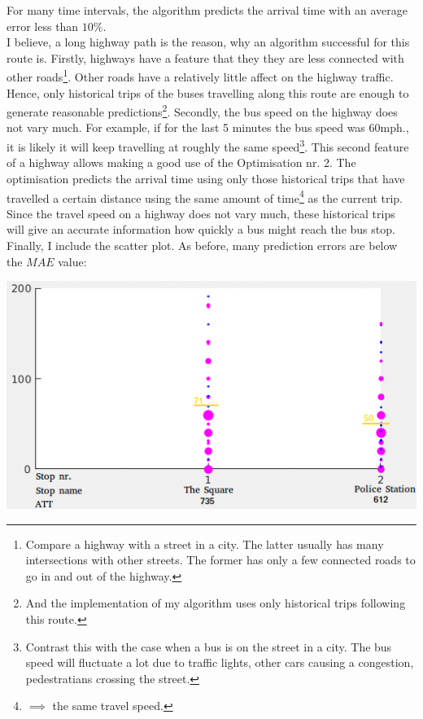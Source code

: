 \documentclass[12pt,a4paper,oneside,openright]{report}
\begin{document}
For many time intervals, the algorithm predicts the arrival time with an average error
less than $10\%$. \\

I believe, a long highway path is the reason, why an algorithm successful for this route is.
Firstly, highways have a feature that they they are less connected with other
roads\footnote{Compare a highway with a street in a city. The latter usually has many
intersections with other streets. The former has only a few connected roads to go in and out
of the highway.}. Other roads have a relatively little affect on the highway traffic.
Hence, only historical trips of the buses travelling along this route are enough to generate
reasonable predictions\footnote{And the implementation of my algorithm uses only historical trips
following this route.}. Secondly, the bus speed on the highway does not vary
much. For example, if for the last 5 minutes the bus speed was $60$mph., it is 
likely it will keep travelling at roughly the same speed\footnote{Contrast this with the
case when a bus is on the street in a city. The bus speed will fluctuate a lot due to
traffic lights, other cars causing a congestion, pedestratians crossing the street.}.
This second feature of a highway allows making a good use of the
Optimisation nr. 2. The optimisation predicts the arrival time using only those
historical trips that have travelled a certain distance using the same amount of
time\footnote{$\implies$ the same travel speed.} as the current trip. Since the travel
speed on a highway does not vary much, these historical trips will give an accurate
information how quickly a bus might reach the bus stop. \\

Finally, I include the scatter plot. As before, many prediction errors are below the $MAE$ value:

\includegraphics[scale=0.5]{figs/best_scatter_plot.png}
\end{document}
